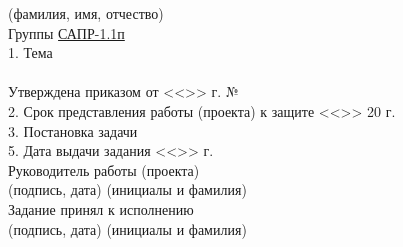 \begin{titlepage}
\begin{flushleft}
            \vspace{-0.2cm}\hspace{5cm}\footnotesize(фамилия, имя, отчество)\normalsize\\
        Группы \underline{\hspace{1cm}САПР-1.1п\hspace{2cm}}\\
        1. Тема \underline{\hspace{15.2cm}}\\
        \underline{\hspace{\textwidth}}\\
        Утверждена приказом от <<\underline{\hspace{1cm}}>> \underline{\hspace{4cm}} 
            \the\year г. № \underline{\hspace{3.6cm}}\\
        2. Срок представления работы (проекта) к защите 
            <<\underline{\hspace{1cm}}>> \underline{\hspace{2.8cm}} 20\underline{\hspace{0.5cm}} г.\\
        3. Постановка задачи\\
        \underline{\hspace{\textwidth}}
        \underline{\hspace{\textwidth}}
        \underline{\hspace{\textwidth}}
        5. Дата выдачи задания <<\underline{\hspace{1cm}}>> \underline{\hspace{4cm}} \the\year г.\\
        Руководитель работы (проекта) \underline{\hspace{5cm}}
            \hspace{0.5cm} \underline{\hspace{4.2cm}}\\
            \vspace{-0.2cm}\hspace{8cm}\footnotesize(подпись, дата)
            \hspace{3cm}(инициалы и фамилия)\normalsize\\
        Задание принял к исполнению \hspace{0.2cm}\underline{\hspace{5cm}}
            \hspace{0.5cm} \underline{\hspace{4.2cm}}\\
            \vspace{-0.2cm}\hspace{8cm}\footnotesize(подпись, дата)
            \hspace{3cm}(инициалы и фамилия)\normalsize\\
    \end{flushleft}
\end{titlepage}
\setcounter{page}{3}